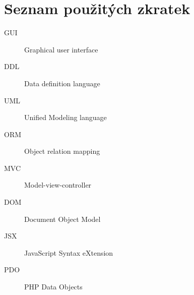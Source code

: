 \documentclass[thesis=B,czech]{FITthesis}[2012/06/26]
\begin{document}



\appendix

\chapter{Seznam použitých zkratek}
\begin{description}
	\item[GUI] Graphical user interface
	\item[DDL] Data definition language
	\item[UML] Unified Modeling language
	\item[ORM] Object relation mapping
	\item[MVC] Model-view-controller
	\item[DOM] Document Object Model
	\item[JSX] JavaScript Syntax eXtension
	\item[PDO] PHP Data Objects
\end{description}
\end{document}
